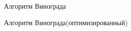 \documentclass[a4paper, 14pt]{article}
\begin{document}
    	\begin{figure}[h]
        	\caption{Алгоритм Винограда}
        	\label{fig:schema_vinograd}
        \end{figure}
        \newpage    
    	\begin{figure}[h]
        	\caption{Алгоритм Винограда(оптимизированный)}
        	\label{fig:schema_vinograd_optimized}
        \end{figure}
        \newpage        
\end{document}
